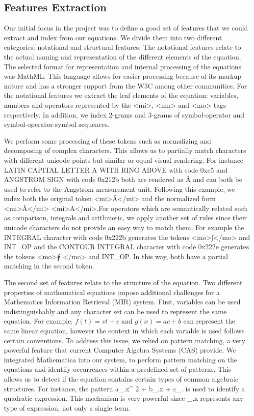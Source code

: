 \documentclass{sig-alternate}
\begin{document}
\subsection{Features Extraction}
Our initial focus in the project was to define a good set of features that we could extract and index from our equations. We divide them into two different categories: notational and structural features. The notational features relate to the actual naming and representation of the different elements of the equation. The selected format for representation and internal processing of the equations was MathML. This language allows for easier processing because of its markup nature and has a stronger support from the W3C among other communities. For the notational features we extract the leaf elements of the equation: variables, numbers and operators represented by the <mi>, <mn> and <mo> tags respectively. In addition, we index 2-grams and 3-grams of symbol-operator and symbol-operator-symbol sequences.

We perform some processing of these tokens such as normalizing and decomposing of complex characters. This allows us to partially match characters with different unicode points but similar or equal visual rendering. For instance LATIN CAPITAL LETTER A WITH RING ABOVE with code 0xc5 and ANGSTROM SIGN with code 0x212b both are rendered as \r{A} and can both be used to refer to the Angstrom measurement unit. Following this example, we index both the original token <mi>\r{A}</mi> and the normalized form <mi>\r{A}</mi> <mi>A</mi>.For operators which are semantically related such as comparison, integrals and arithmetic, we apply another set of rules since their unicode characters do not provide an easy way to match them.
For example the INTEGRAL character with code 0x222b generates the tokens <mo>{\unicodefont ∫}</mo> and INT\_OP and the CONTOUR INTEGRAL character with code 0x222e generates the tokens <mo>{\unicodefont ∮} </mo> and INT\_OP. In this way, both have a partial matching in the second token.

The second set of features relate to the structure of the equation. Two different properties of mathematical equations impose additional challenges for a Mathematics Information Retrieval (MIR) system. First, variables can be used indistinguishably and any character set can be used to represent the same equation. For example, $f(t) = vt + c $ and $g(x) = ac + b$ can represent the same linear equation, however the context in which each variable is used follows certain conventions. To address this issue, we relied on pattern matching, a very powerful feature that current Computer Algebra Systems (CAS) provide. We integrated Mathematica\cite{mathematica} into our system, to perform pattern matching on the equations and identify occurrences within a predefined set of patterns. This allows us to detect if the equation contains certain types of common algebraic structures. For instance, the pattern {\codefont a\_.x\^{} 2 + b\_.x + c\_.} is used to identify a quadratic expression. This mechanism is very powerful since \_.x represents any type of expression, not only a single term. 
\end{document}
